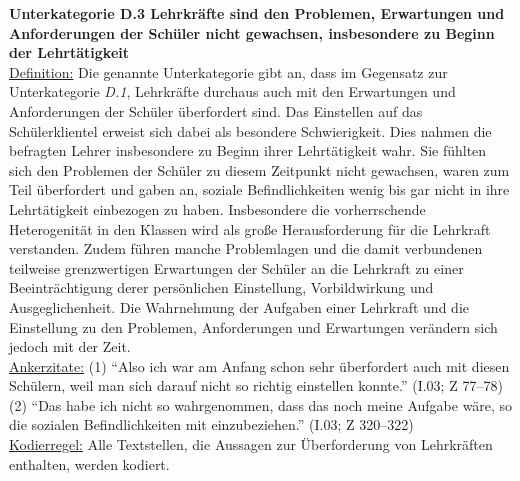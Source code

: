 \noindent
\textbf{Unterkategorie D.3 Lehrkräfte sind den Problemen, Erwartungen und Anforderungen der Schüler nicht gewachsen, insbesondere zu Beginn der Lehrtätigkeit}\\
\underline{Definition:} Die genannte Unterkategorie gibt an, dass im Gegensatz zur Unterkategorie \textit{D.1}, Lehrkräfte durchaus auch mit den Erwartungen und Anforderungen der Schüler überfordert sind. Das Einstellen auf das Schülerklientel erweist sich dabei als besondere Schwierigkeit. Dies nahmen die befragten Lehrer insbesondere zu Beginn ihrer Lehrtätigkeit wahr. Sie fühlten sich den Problemen der Schüler zu diesem Zeitpunkt nicht gewachsen, waren zum Teil überfordert und gaben an, soziale Befindlichkeiten wenig bis gar nicht in ihre Lehrtätigkeit einbezogen zu haben. Insbesondere die vorherrschende Heterogenität in den Klassen wird als große Herausforderung für die Lehrkraft verstanden. Zudem führen manche Problemlagen und die damit verbundenen teilweise grenzwertigen Erwartungen der Schüler an die Lehrkraft zu einer Beeinträchtigung derer persönlichen Einstellung, Vorbildwirkung und Ausgeglichenheit. Die Wahrnehmung der Aufgaben einer Lehrkraft und die Einstellung zu den Problemen, Anforderungen und Erwartungen verändern sich jedoch mit der Zeit.\\
\underline{Ankerzitate:} (1) "`Also ich war am Anfang schon sehr überfordert auch mit diesen Schülern, weil man sich darauf nicht so richtig einstellen konnte."' (I.03; Z 77--78)\\ (2) "`Das habe ich nicht so wahrgenommen, dass das noch meine Aufgabe wäre, so die sozialen Befindlichkeiten mit einzubeziehen."' (I.03; Z 320--322)\\
\underline{Kodierregel:} Alle Textstellen, die Aussagen zur Überforderung von Lehrkräften enthalten, werden kodiert.\\

